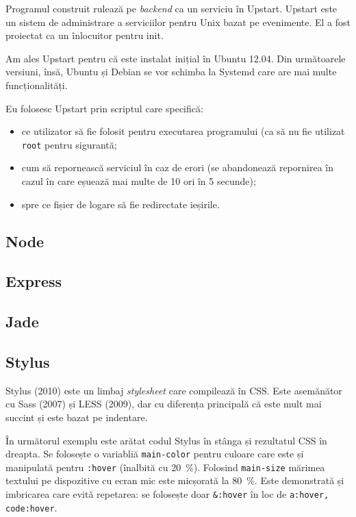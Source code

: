 \documentclass[a4wide,12pt]{report}
\newcommand{\eng}[1]{\emph{#1}} %
\newcommand{\cod}[1]{\texttt{#1}}
\begin{document}
Programul construit rulează pe \eng{backend} ca un serviciu în Upstart. Upstart
este un sistem de administrare a serviciilor pentru Unix bazat pe evenimente.
El a fost proiectat ca un înlocuitor pentru init.

Am ales Upstart pentru că este instalat inițial în Ubuntu 12.04. Din următoarele
versiuni, însă, Ubuntu și Debian se vor schimba la Systemd care are mai multe
funcționalități.

Eu folosesc Upstart prin scriptul care specifică:
\begin{itemize}
    \item ce utilizator să fie folosit pentru executarea programului (ca să nu
    fie utilizat \cod{root} pentru sigurantă;
    \item cum să repornească serviciul în caz de erori (se abandonează
    repornirea în cazul în care eșuează mai multe de 10 ori în 5 secunde);
    \item spre ce fișier de logare să fie redirectate ieșirile.
    
\end{itemize}

\subsection{Node}

\subsection{Express}

\subsection{Jade}

\subsection{Stylus}

Stylus (2010) este un limbaj \eng{stylesheet} care compilează în CSS. Este
asemănător cu Sass (2007) și LESS (2009), dar cu diferența principală că este
mult mai succint și este bazat pe indentare.

În următorul exemplu este arătat codul Stylus în stânga și rezultatul CSS în
dreapta. Se folosește o variabliă \cod{main-color} pentru culoare care este și
manipulată pentru \cod{:hover} (înalbită cu 20~\%). Folosind \cod{main-size}
mărimea textului pe dispozitive cu ecran mic este micșorată la 80~\%. Este
demonstrată și imbricarea care evită repetarea: se folosește doar \cod{\&:hover}
în loc de \cod{a:hover, code:hover}.
\end{document}
